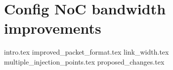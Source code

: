 \chapter{Config NoC bandwidth improvements}
{intro.tex}
{improved_packet_format.tex}
{link_width.tex}
{multiple_injection_points.tex}
{proposed_changes.tex}